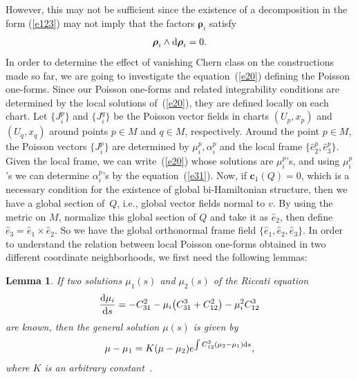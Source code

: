 \documentclass[pdftex]{sigma}
\numberwithin{equation}{section}
\newtheorem{Lemma}[Theorem]{Lemma}
\begin{document}
However, this may not be suf\/f\/icient since the existence of a decomposition in the form (\ref{e123}) may not imply that the factors $\boldsymbol{\rho }_{i}$ satisfy
\begin{gather*}
\boldsymbol{\rho }_{i}\wedge {\rm d}\boldsymbol{\rho }_{i}=0.
\end{gather*}
In order to determine the ef\/fect of vanishing Chern class on the constructions made so far, we are going to investigate the equation~(\ref{e20}) def\/ining the Poisson one-forms. Since our Poisson one-forms and related integrability conditions are determined by the local solutions of~(\ref{e20}), they are def\/ined locally on each chart. Let $\big\{ J_{i}^{p}\big\} $ and $\big\{ J_{i}^{q}\big\} $ be the Poisson vector f\/ields in charts $( U_{p},x _{p}) $ and $ ( U_{q},x _{q}) $ around points $p\in M$ and $q\in M$, respectively. Around the point $p\in M$, the Poisson vectors $\big\{ J_{i}^{p}\big\} $ are determined by $\mu _{i}^{p},\alpha _{i}^{p}$ and the local frame $\big\{ \widehat{e}_{2}^{p}, \widehat{e}_{3}^{p}\big\} $. Given the local frame, we can write~(\ref{e20}) whose solutions are $\mu _{i}^{p}$'s, and using $\mu _{i}^{p}$'s we can determine $\alpha _{i}^{p}$'s by the equation~(\ref{e31}). Now, if $\boldsymbol{c}_{1}(Q) =0$, which is a necessary condition for the existence of global bi-Hamiltonian structure, then we have a global section of~$Q$, i.e., global vector f\/ields normal to $v$. By using the metric on $M$, normalize this global section of $Q$ and take it as $\widehat{e}_{2}$, then def\/ine $\widehat{e}_{3}=\widehat{e}_{1}\times \widehat{e}_{2}$. So we have the global orthonormal frame f\/ield $\{ \widehat{e}_{1},\widehat{e}_{2},\widehat{e}_{3}\} $. In order to understand the relation between local Poisson one-forms obtained in two dif\/ferent coordinate neighborhoods, we f\/irst need the following lemmas:

\begin{Lemma}\label{lemma3}
If two solutions $\mu _{1}(s) $ and $\mu _{2}(s) $ of the Riccati equation
\begin{gather*}
\frac{{\rm d}\mu _{i}}{{\rm d}s}=-C_{31}^{2}-\mu _{i}\big( C_{31}^{3}+C_{12}^{2}\big) -\mu _{i}^{2}C_{12}^{3}
\end{gather*}
are known, then the general solution $\mu (s) $ is given by
\begin{gather*}
\mu -\mu _{1}=K ( \mu -\mu _{2} ) e^{\int C_{12}^{3}(\mu _{2}-\mu _{1}) {\rm d}s},
\end{gather*}
where $K$ is an arbitrary constant~{\rm \cite{Ince}}.
\end{Lemma}
\end{document}
